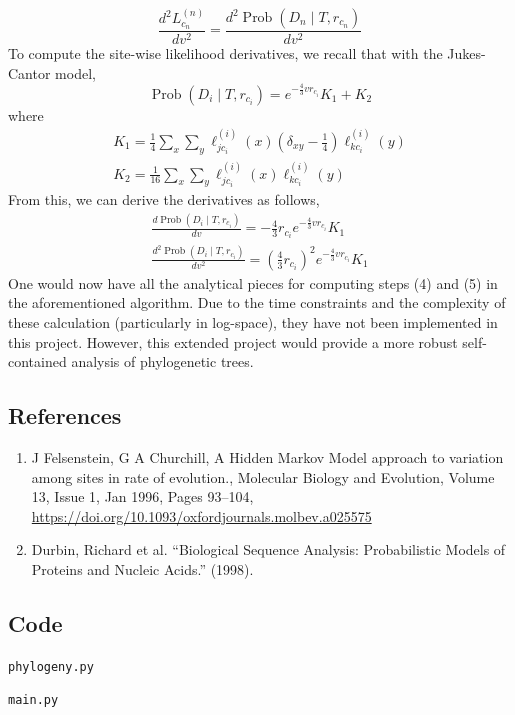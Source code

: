 \documentclass[12pt]{article}
\newcommand{\prob}{\operatorname{Prob}}
\begin{document}
    \[
        \frac{d^2L_{c_n}^{(n)}}{dv^2} = \frac{d^2\prob(D_n \mid T, r_{c_n})}{dv^2}
    \]
    To compute the site-wise likelihood derivatives,
    we recall that with the Jukes-Cantor model,
    \[
        \prob(D_i \mid T, r_{c_i})
        = e^{-\frac{4}{3}vr_{c_i}}K_1 + K_2
    \]
    where
    \begin{gather*}
        K_1 = \frac{1}{4}\sum_x \sum_y 
            \ell_{jc_i}^{(i)}(x) \left(\delta_{xy} - \frac{1}{4}\right) \ell_{kc_i}^{(i)}(y) \\
        K_2 = \frac{1}{16}\sum_x \sum_y 
            \ell_{jc_i}^{(i)}(x) \ell_{kc_i}^{(i)}(y)
    \end{gather*}
    From this, we can derive the derivatives as follows,
    \begin{gather*}
        \frac{d\prob(D_i \mid T, r_{c_i})}{dv} = -\frac{4}{3}r_{c_i}e^{-\frac{4}{3}vr_{c_i}}K_1 \\
        \frac{d^2\prob(D_i \mid T, r_{c_i})}{dv^2} = \left(\frac{4}{3}r_{c_i}\right)^2e^{-\frac{4}{3}vr_{c_i}}K_1
    \end{gather*}
    One would now have all the analytical pieces for computing steps (4) and (5) in the aforementioned algorithm.
    Due to the time constraints and the complexity of these calculation (particularly in log-space), they have not been implemented in this project.
    However, this extended project would provide a more robust self-contained analysis of phylogenetic trees.

\subsection*{References}
    \begin{enumerate}
    \item 
        \begin{adjustwidth}{0.1in}{1in}
            J Felsenstein, G A Churchill, 
            A Hidden Markov Model approach to variation among sites in rate of evolution., 
            Molecular Biology and Evolution, Volume 13, Issue 1, Jan 1996, Pages 93–104, \\
            \url{https://doi.org/10.1093/oxfordjournals.molbev.a025575}
        \end{adjustwidth}

    \item 
        \begin{adjustwidth}{0.1in}{1in}
            Durbin, Richard et al. “Biological Sequence Analysis: Probabilistic Models of Proteins and Nucleic Acids.” (1998).
        \end{adjustwidth}
    \end{enumerate}

\newpage
\subsection*{Code}
    \texttt{phylogeny.py}
    

    \newpage
    \texttt{main.py}
    
\end{document}
